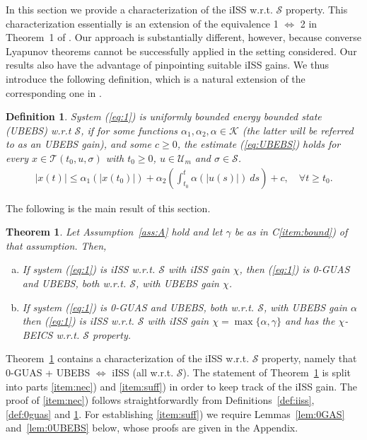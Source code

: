 \documentclass[9pt,final,journal]{IEEEtran}
\newtheorem{defin}{Definition}
\newtheorem{teo}{Theorem}
\def\K{\mathcal{K}}
\def\S{\mathcal{S}}
\def\T{\mathcal{T}}
\def\U{\mathcal{U}}
\begin{document}
In this section we provide a characterization of the iISS w.r.t. $\S$ property. This characterization essentially is an extension of the equivalence 1 $\Longleftrightarrow$ 2 in Theorem~1 of \cite{angson_dc00}. Our approach is substantially different, however, because converse Lyapunov theorems cannot be successfully applied in the setting considered. Our results also have the advantage of pinpointing suitable iISS gains. We thus introduce the following definition, which is a natural extension of the corresponding one in \cite{angson_dc00}.
\begin{defin} 
  \label{def:ubebs}
  System (\ref{eq:1}) is uniformly bounded energy bounded state (UBEBS) w.r.t $\S$, if for some functions $\alpha_1, \alpha_2, \alpha \in \K$ (the latter will be referred to as an UBEBS gain), and some $c\ge 0$, the estimate (\ref{eq:UBEBS}) holds for every $x \in \T(t_0,u,\sigma)$ with $t_0\ge 0$, $u\in \U_m$ and 
$\sigma\in \S$.
 \begin{align} 
 \label{eq:UBEBS}
  |x(t)|\le \alpha_1(|x(t_0)|)+\alpha_2\left (\int_{t_0}^t\alpha(|u(s)|)\:ds\right )+c,\quad \forall t\ge t_0.
 \end{align}
\end{defin}
%
The following is the main result of this section.
\begin{teo}
  \label{UBEBSand0GASiffiiss}
  Let Assumption~\ref{ass:A} hold and let $\gamma$ be as in C\ref{item:bound}) of that assumption. Then, 
  \begin{enumerate}[a)]
  \item If system (\ref{eq:1}) is iISS w.r.t. $\S$ with iISS gain $\chi$, then (\ref{eq:1}) is 0-GUAS and UBEBS, both w.r.t. $\S$, with UBEBS gain $\chi$.\label{item:nec}
  \item If system (\ref{eq:1}) is 0-GUAS and UBEBS, both w.r.t. $\S$, with UBEBS gain $\alpha$ then (\ref{eq:1}) is iISS w.r.t. $\S$ with iISS gain $\chi = \max\{\alpha, \gamma\}$ and has the $\chi$-BEICS w.r.t. $\S$ property.\label{item:suff}
  \end{enumerate}
\end{teo}
Theorem~\ref{UBEBSand0GASiffiiss} contains a characterization of the iISS w.r.t. $\S$ property, namely that 0-GUAS + UBEBS $\Longleftrightarrow$ iISS (all w.r.t. $\S$). The statement of Theorem~\ref{UBEBSand0GASiffiiss} is split into parts \ref{item:nec}) and \ref{item:suff}) in order to keep track of the iISS gain. The proof of \ref{item:nec}) follows straightforwardly from Definitions~\ref{def:iiss}, \ref{def:0guas} and \ref{def:ubebs}. For establishing \ref{item:suff}) we require Lemmas~\ref{lem:0GAS} and~\ref{lem:0UBEBS} below, whose proofs are given in the Appendix. 
\end{document}
